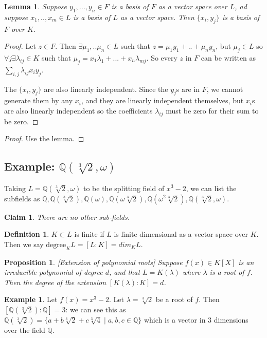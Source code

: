 \documentclass{article}
\theoremstyle{definition}
\newtheorem{defn}{Definition}[section]
\newtheorem{exmp}{Example}[section]
\theoremstyle{plain}%
\newtheorem{lem}[thm]{Lemma}
\newtheorem{prop}[thm]{Proposition}
\newtheorem*{clm}{Claim}
\theoremstyle{remark}
\newcommand{\Q}{\mathbb{Q}}
\begin{document}
\begin{lem}
Suppose $y_1, ..., y_n \in F$ is a basis of $F$ as a vector space over $L$, ad suppose $x_1, .., x_m \in L$ is a basis of $L$ as a vector space. Then $\{x_i, y_j\}$ is a basis of $F$ over $K$.
\end{lem}

\begin{proof}
Let $z \in F$. Then $\exists \mu_1, .. \mu_n \in L$ such that $z = \mu_1y_1 + .. + \mu_ny_n$, but $\mu_j \in L$ so $\forall j \exists \lambda_{ij} \in K$ such that $\mu_j = x_1\lambda_1 + ... + x_n\lambda_{mj}$.
So every $z$ in $F$ can be written as $\sum_{i,j} \lambda_{ij}x_iy_j$.

The $\{x_i,y_j\}$ are also linearly independent. Since the $y_j$s are in $F$, we cannot generate them by any $x_i$, and they are linearly independent themselves, but $x_i$s are also linearly independent so the coefficients $\lambda_{ij}$ must be zero for their sum to be zero.
\end{proof}

\begin{proof}
Use the lemma.
\end{proof}

\subsection{Example: $\Q(\sqrt[3]{2}, \omega)$}

Taking $L = \Q(\sqrt[3]{2}, \omega)$ to be the splitting field of $x^3 - 2$, we can list the subfields as $\Q, \Q(\sqrt[3]{2}), \Q(\omega), \Q(\omega\sqrt[3]{2}), \Q(\omega^2\sqrt[3]{2}), \Q(\sqrt[3]{2}, \omega)$.

\begin{clm}
There are no other sub-fields.
\end{clm}

\begin{defn}
$K \subset L$ is finite  if $L$ is finite dimensional as a vector space over $K$. Then we say $\text{degree}_K L = [L:K] = dim_K L$.
\end{defn}

\begin{prop}\label{Poly ext prop}[Extension of polynomial roots]
Suppose $f(x) \in K[X]$ is an irreducible polynomial of degree $d$, and that $L = K(\lambda)$ where $\lambda$ is a root of $f$. Then the degree of the extension $[K(\lambda) : K] = d$.
\end{prop}

\begin{exmp}
Let $f(x) = x^3 - 2$. Let $\lambda = \sqrt[3]{2}$ be a root of $f$. Then \\ $[\Q(\sqrt[3]{2}) : \Q] = 3$: we can see this as $\Q(\sqrt[3]{2}) = \{a + b\sqrt[3]{2} + c\sqrt[3]{4} \; | \; a,b,c \in \Q\}$ which is a vector in 3 dimensions over the field $\Q$.
\end{exmp}
\end{document}
